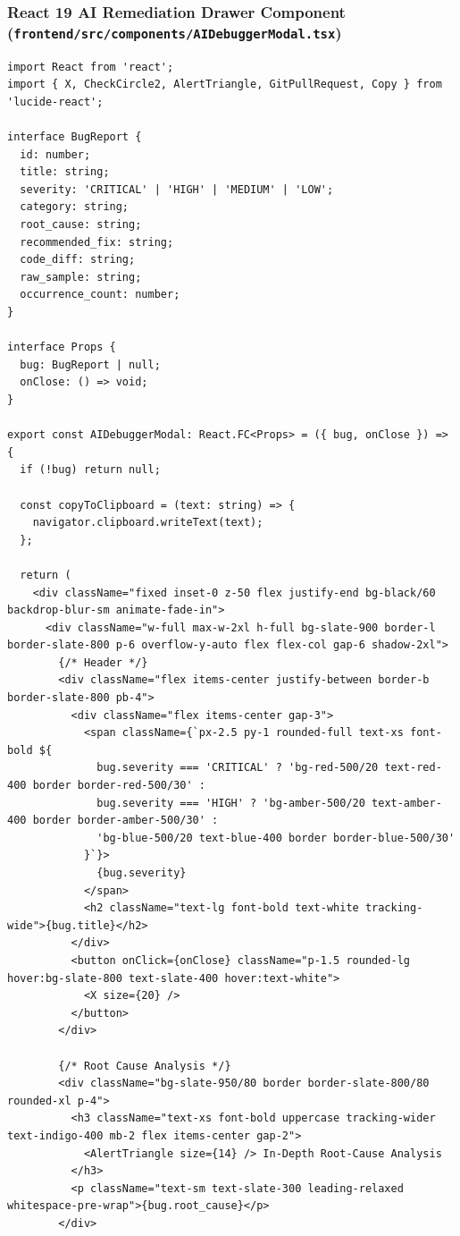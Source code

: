 \documentclass[12pt,a4paper]{article}
\begin{document}
\subsubsection{React 19 AI Remediation Drawer Component (\texttt{frontend/src/components/AIDebuggerModal.tsx})}
\begin{lstlisting}[style=pystyle, caption={React 19 TypeScript AI Root-Cause and Git Diff Viewer Component}]
import React from 'react';
import { X, CheckCircle2, AlertTriangle, GitPullRequest, Copy } from 'lucide-react';

interface BugReport {
  id: number;
  title: string;
  severity: 'CRITICAL' | 'HIGH' | 'MEDIUM' | 'LOW';
  category: string;
  root_cause: string;
  recommended_fix: string;
  code_diff: string;
  raw_sample: string;
  occurrence_count: number;
}

interface Props {
  bug: BugReport | null;
  onClose: () => void;
}

export const AIDebuggerModal: React.FC<Props> = ({ bug, onClose }) => {
  if (!bug) return null;

  const copyToClipboard = (text: string) => {
    navigator.clipboard.writeText(text);
  };

  return (
    <div className="fixed inset-0 z-50 flex justify-end bg-black/60 backdrop-blur-sm animate-fade-in">
      <div className="w-full max-w-2xl h-full bg-slate-900 border-l border-slate-800 p-6 overflow-y-auto flex flex-col gap-6 shadow-2xl">
        {/* Header */}
        <div className="flex items-center justify-between border-b border-slate-800 pb-4">
          <div className="flex items-center gap-3">
            <span className={`px-2.5 py-1 rounded-full text-xs font-bold ${
              bug.severity === 'CRITICAL' ? 'bg-red-500/20 text-red-400 border border-red-500/30' :
              bug.severity === 'HIGH' ? 'bg-amber-500/20 text-amber-400 border border-amber-500/30' :
              'bg-blue-500/20 text-blue-400 border border-blue-500/30'
            }`}>
              {bug.severity}
            </span>
            <h2 className="text-lg font-bold text-white tracking-wide">{bug.title}</h2>
          </div>
          <button onClick={onClose} className="p-1.5 rounded-lg hover:bg-slate-800 text-slate-400 hover:text-white">
            <X size={20} />
          </button>
        </div>

        {/* Root Cause Analysis */}
        <div className="bg-slate-950/80 border border-slate-800/80 rounded-xl p-4">
          <h3 className="text-xs font-bold uppercase tracking-wider text-indigo-400 mb-2 flex items-center gap-2">
            <AlertTriangle size={14} /> In-Depth Root-Cause Analysis
          </h3>
          <p className="text-sm text-slate-300 leading-relaxed whitespace-pre-wrap">{bug.root_cause}</p>
        </div>


\end{lstlisting}
\end{document}
